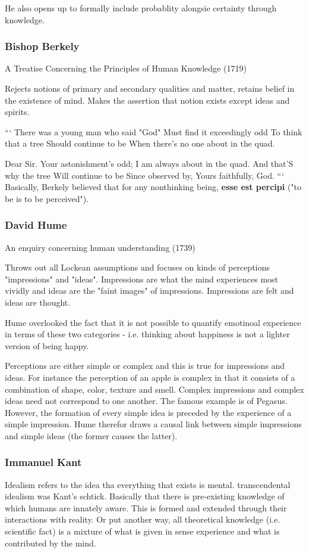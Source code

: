 \documentclass[11pt]{article}
\begin{document}
He also opens up to formally include probablity alongsie certainty through 
knowledge. 

\subsubsection{Bishop Berkely}
\label{sec:org86415ab}
A Treatise Concerning the Principles of Human Knowledge (1719)

Rejects notions of primary and secondary qualities and matter, retains
belief in the existence of mind. 
Makes the assertion that notion exists except ideas and spirits. 

```
There was a young man who said "God"
Must find it exceedingly odd 
To think that a tree 
Should continue to be 
When there's no one about in the quad.

Dear Sir. Your astonishment's odd;
I am always about in the quad.
And that'S why the tree
Will continue to be 
Since observed by, Yours faithfully, God.
```
Basically, Berkely believed that for any nonthinking being, \textbf{esse est percipi} 
("to be is to be perceived").

\subsubsection{David Hume}
\label{sec:org6ea0028}
An enquiry concerning human understanding (1739)

Throws out all Lockean assumptions and focuses on kinds of
perceptions "impressions" and "ideas". Impressions are what the mind experiences 
most vividly and ideas are the "faint images" of impressions. Impressions are 
felt and ideas are thought. 

Hume overlooked the fact that it is not possible to quantify emotinoal experience 
in terms of these two categories - i.e. thinking about happiness is not a lighter
version of being happy.

Perceptions are either simple or complex and this is true for impressions and ideas. 
For instance the perception of an apple is complex in that it consists of a combination
of shape, color, texture and smell. Complex impressions and complex ideas need not 
correspond to one another. The famous example is of Pegasus. However, the formation of 
every simple idea is preceded by the experience of a simple impression. Hume therefor
draws a causal link between simple impressions and simple ideas (the former causes the 
latter).


\subsubsection{Immanuel Kant}
\label{sec:orgbea37fd}
Idealism refers to the idea tha everything that exists is mental. 
transcendental idealism was Kant's schtick. Basically that there
is pre-existing knowledge of which humans are innately aware. This is
formed and extended through their interactions with reality. Or put another way, 
all theoretical knowledge (i.e. scientific fact) is a mixture of what is given
in sense experience and what is contributed by the mind. 
\end{document}
